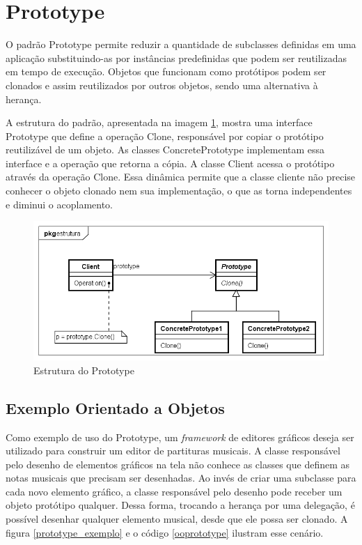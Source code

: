 \section{Prototype}

O padrão Prototype permite reduzir a quantidade 
de subclasses definidas em uma aplicação 
substituindo-as por instâncias predefinidas 
que podem ser reutilizadas em tempo de 
execução. Objetos que funcionam como 
protótipos podem ser clonados e assim 
reutilizados por outros objetos, sendo uma 
alternativa à herança. 

A estrutura do padrão, apresentada na imagem 
\ref{prototype_struct}, mostra uma interface 
Prototype que define a operação Clone, responsável 
por copiar o protótipo reutilizável de um objeto. 
As classes ConcretePrototype implementam essa 
interface e a operação que retorna a cópia. 
A classe Client acessa o protótipo através da operação 
Clone. Essa dinâmica permite que a classe cliente 
não precise conhecer o objeto clonado nem sua 
implementação, o que as torna independentes e 
diminui o acoplamento.

\begin{figure}[htb]
	\caption{\label{prototype_struct}Estrutura do Prototype}
	\begin{center}
	    \includegraphics[scale=0.5]{5_padroes-contexto-funcional/5.1_criacionais/5.1.4_prototype/prototype_estrutura.png}
	\end{center}
\end{figure}


\subsection*{Exemplo Orientado a Objetos}

Como exemplo de uso do Prototype, um 
\textit{framework} de editores gráficos deseja 
ser utilizado para construir um editor de 
partituras musicais. A classe responsável pelo 
desenho de elementos gráficos na tela não 
conhece as classes que definem as notas musicais que 
precisam ser desenhadas. Ao invés de criar uma 
subclasse para cada novo elemento gráfico, 
a classe responsável pelo desenho 
pode receber um objeto protótipo qualquer. 
Dessa forma, trocando a herança 
por uma delegação, é possível desenhar qualquer 
elemento musical, desde que ele possa ser 
clonado. A figura \ref{prototype_exemplo} e 
o código \ref{ooprototype} ilustram esse cenário.

